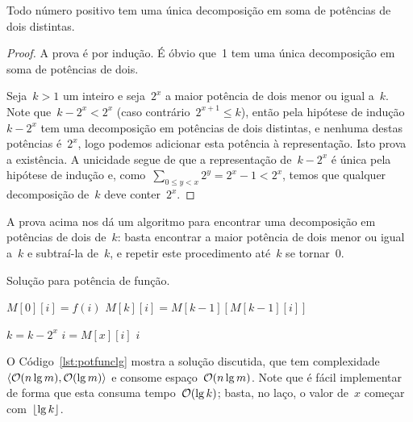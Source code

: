 \documentclass[main.tex]{subfiles}
\begin{document}
\begin{theorem} \label{thm:pot2}
	Todo número positivo tem uma única decomposição em soma de potências de dois distintas.
\end{theorem}
\begin{proof}
	A prova é por indução. É óbvio que~1 tem uma única decomposição em soma de potências de dois.

	Seja~$k > 1$ um inteiro e seja~$2^x$ a maior potência de dois menor ou igual a~$k$. Note que~$k - 2^x < 2^x$ (caso contrário~$2^{x+1} \leq k$), então pela hipótese de indução~$k - 2^x$ tem uma decomposição em potências de dois distintas, e nenhuma destas potências é~$2^x$, logo podemos adicionar esta potência à representação. Isto prova a existência. A unicidade segue de que a representação de~$k - 2^x$ é única pela hipótese de indução e, como~$\sum\limits_{0 \leq y < x}{2^{y}} = 2^x - 1 < 2^x$, temos que qualquer decomposição de~$k$ deve conter~$2^x$.
\end{proof}

A prova acima nos dá um algoritmo para encontrar uma decomposição em potências de dois de~$k$: basta encontrar a maior potência de dois menor ou igual a~$k$ e subtraí-la de~$k$, e repetir este procedimento até~$k$ se tornar~0.

\begin{algorithm}
	\caption{Solução para potência de função.} \label{lst:potfunclg}
\begin{algorithmic}[1]
			\State $M[0][i] = f(i)$
		\EndFor
				\State $M[k][i] = M[k - 1][M[k - 1][i]]$
			\EndFor
		\EndFor
	\EndFunction

	 
				\State $k = k - 2^x$
				\State $i = M[x][i]$
			\EndIf
		\EndFor
		\State \Return $i$
	\EndFunction
\end{algorithmic}
\end{algorithm}

O Código~\ref{lst:potfunclg} mostra a solução discutida, que tem complexidade~$\langle\mathcal{O}(n\lg m), \mathcal{O}(\lg m)\rangle$ e consome espaço~$\mathcal{O}(n \lg m)$. Note que é fácil implementar~ de forma que esta consuma tempo~$\mathcal{O}(\lg k)$; basta, no laço, o valor de~$x$ começar com~$\lfloor\lg k\rfloor$.
\end{document}
